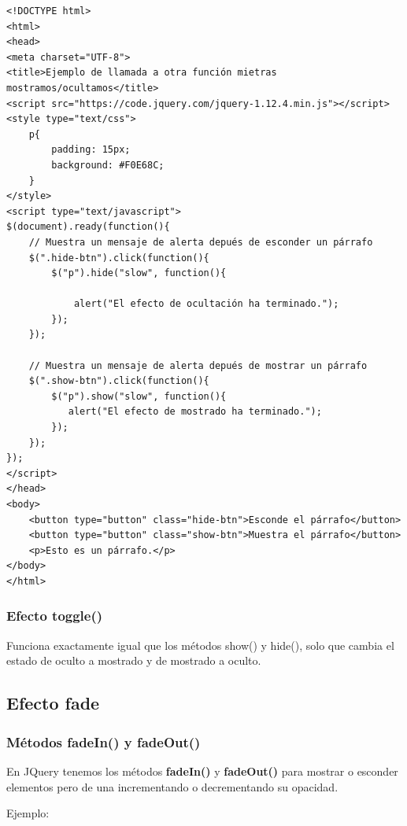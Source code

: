 \documentclass[11pt]{article}
\begin{document}
\begin{verbatim}
<!DOCTYPE html>
<html>
<head>
<meta charset="UTF-8">
<title>Ejemplo de llamada a otra función mietras mostramos/ocultamos</title>
<script src="https://code.jquery.com/jquery-1.12.4.min.js"></script>
<style type="text/css">
    p{
        padding: 15px;
        background: #F0E68C;
    }
</style>
<script type="text/javascript">
$(document).ready(function(){
    // Muestra un mensaje de alerta depués de esconder un párrafo
    $(".hide-btn").click(function(){
        $("p").hide("slow", function(){

            alert("El efecto de ocultación ha terminado.");
        });
    });

    // Muestra un mensaje de alerta depués de mostrar un párrafo
    $(".show-btn").click(function(){
        $("p").show("slow", function(){
           alert("El efecto de mostrado ha terminado.");
        });
    });
});
</script>
</head>
<body>
    <button type="button" class="hide-btn">Esconde el párrafo</button> 
    <button type="button" class="show-btn">Muestra el párrafo</button>
    <p>Esto es un párrafo.</p>
</body>
</html>                                		
\end{verbatim}

\subsubsection*{Efecto toggle()}
\label{sec:orgcee44fb}

Funciona exactamente igual que los métodos show() y hide(), solo que cambia el estado de oculto a mostrado y de mostrado a oculto.

\subsection*{Efecto fade}
\label{sec:org49c492e}

\subsubsection*{Métodos fadeIn() y fadeOut()}
\label{sec:org3243877}

En JQuery tenemos los métodos \textbf{fadeIn()} y \textbf{fadeOut()} para mostrar o esconder elementos pero de una incrementando o decrementando su opacidad.

Ejemplo:
\end{document}
